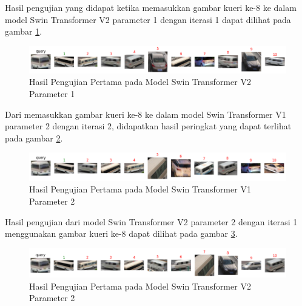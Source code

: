 Hasil pengujian yang didapat ketika memasukkan gambar kueri ke-8 ke dalam model Swin Transformer V2 parameter 1 dengan 
iterasi 1 dapat dilihat pada gambar \ref{fig:hasilpengujianpertamapadamodelswintransformerv2param1}.

\begin{figure}[h!]
  \centering
  \includegraphics[scale=0.6]{gambar/Que8V2P1IT1.png}
  \caption{Hasil Pengujian Pertama pada Model Swin Transformer V2 Parameter 1}
  \label{fig:hasilpengujianpertamapadamodelswintransformerv2param1}
\end{figure}

Dari memasukkan gambar kueri ke-8 ke dalam model Swin Transformer V1 parameter 2 dengan iterasi 2, didapatkan hasil 
peringkat yang dapat terlihat pada gambar \ref{fig:hasilpengujianpertamapadamodelswintransformerv1param2}.

\begin{figure}[h!]
  \centering
  \includegraphics[scale=0.6]{gambar/Que8V1P2IT2.png}
  \caption{Hasil Pengujian Pertama pada Model Swin Transformer V1 Parameter 2}
  \label{fig:hasilpengujianpertamapadamodelswintransformerv1param2}
\end{figure}

Hasil pengujian dari model Swin Transformer V2 parameter 2 dengan iterasi 1 menggunakan gambar kueri ke-8 dapat 
dilihat pada gambar \ref{fig:hasilpengujianpertamapadamodelswintransformerv2param2}.

\begin{figure}[h!]
  \centering
  \includegraphics[scale=0.6]{gambar/Que8V2P2IT1.png}
  \caption{Hasil Pengujian Pertama pada Model Swin Transformer V2 Parameter 2}
  \label{fig:hasilpengujianpertamapadamodelswintransformerv2param2}
\end{figure}

